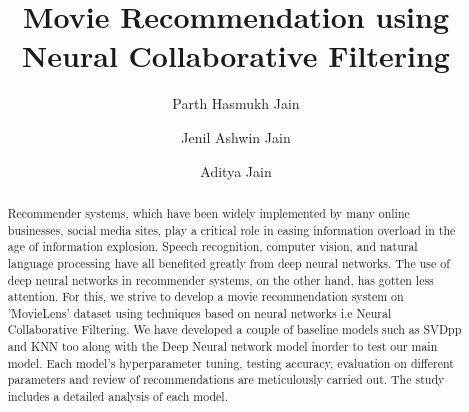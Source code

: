 \documentclass[sigconf]{acmart}
\begin{document}
\title{Movie Recommendation using Neural Collaborative Filtering}

\author{Parth Hasmukh Jain}
\author{Jenil Ashwin Jain}
\author{Aditya Jain}
\begin{abstract}
Recommender systems, which have been widely implemented by many online businesses, social media sites, play a critical role in easing information overload in the age of information explosion. Speech recognition, computer vision, and natural language processing have all benefited greatly from deep neural networks. The use of deep neural networks in recommender systems, on the other hand, has gotten less attention. For this, we strive to develop a movie recommendation system on 'MovieLens' dataset using techniques based on neural networks i.e Neural Collaborative Filtering. We have developed a couple of baseline models such as SVDpp and KNN too along with the Deep Neural network model inorder to test our main model. Each model's hyperparameter tuning, testing accuracy, evaluation on different parameters and review of recommendations are meticulously carried out. The study includes a detailed analysis of each model.
\end{abstract}



\maketitle

\end{document}
